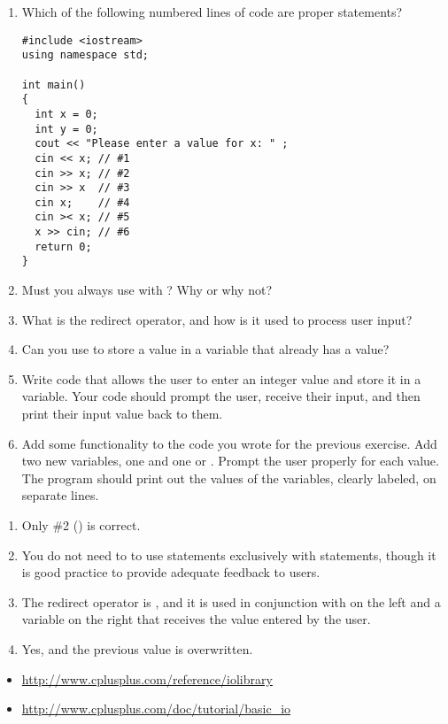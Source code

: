 \begin{enumerate}
	\item Which of the following numbered lines of code are proper  statements?

\noindent\begin{minipage}{\linewidth}\begin{lstlisting}
#include <iostream>
using namespace std;

int main()
{
  int x = 0;
  int y = 0;
  cout << "Please enter a value for x: " ;
  cin << x; // #1
  cin >> x; // #2
  cin >> x  // #3
  cin x;    // #4
  cin >< x; // #5
  x >> cin; // #6
  return 0;
}
\end{lstlisting}\end{minipage}

  \item Must you always use  with ? Why or why not?
  \item What is the redirect operator, and how is it used to process user input?
  \item Can you use  to store a value in a variable that already has a value?

  \item Write code that allows the user to enter an integer value and store it in a variable. Your code should prompt the user, receive their input, and then print their input value back to them.
  \item Add some functionality to the code you wrote for the previous exercise. Add two new variables, one  and one  or . Prompt the user properly for each value. The program should print out the values of the variables, clearly labeled, on separate lines.

\end{enumerate}


\begin{enumerate}
	\item Only \#2 () is correct.
	\item You do not need to to use  statements exclusively with  statements, though it is good practice to provide adequate feedback to users.
	\item The redirect operator is \Code{>>}, and it is used in conjunction with  on the left and a variable on the right that receives the value entered by the user.
	\item Yes, and the previous value is overwritten.
\end{enumerate}


\begin{itemize}
\item \url{http://www.cplusplus.com/reference/iolibrary}
\item \url{http://www.cplusplus.com/doc/tutorial/basic_io}
\end{itemize}	

